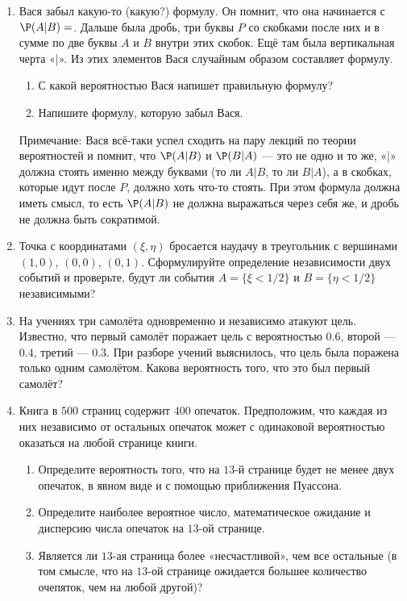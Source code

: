 \begin{enumerate}
\item Вася забыл какую-то (какую?) формулу. Он помнит, что она начинается
с $\P(A|B) = $. Дальше была дробь, три буквы $P$ со скобками после них и
в сумме по две буквы $A$ и $B$ внутри этих скобок. Ещё там была вертикальная черта «|».
Из этих элементов Вася случайным образом составляет формулу.
\begin{enumerate}
\item С какой вероятностью Вася напишет правильную формулу?
\item Напишите формулу, которую забыл Вася.
\end{enumerate}

Примечание: Вася всё-таки успел сходить на пару лекций по теории вероятностей и помнит,
что $\P(A|B)$ и $\P(B|A)$ — это не одно и то же, «|» должна стоять именно между буквами
(то ли $A|B$, то ли $B|A$), а в скобках, которые идут после $P$, должно хоть что-то стоять.
При этом формула должна иметь смысл, то есть  $\P(A|B)$   не должна выражаться через себя же,
и дробь не должна быть сократимой.

\item Точка с координатами $(\xi, \eta)$ бросается наудачу в треугольник с вершинами
$(1,0)$, $(0,0)$, $(0,1)$. Сформулируйте определение независимости двух событий и
проверьте, будут ли события $A=\{ \xi < 1/2 \}$  и $B=\{ \eta < 1/2 \}$  независимыми?

\item На учениях три самолёта одновременно и независимо атакуют цель.
Известно, что первый самолёт поражает цель с вероятностью $0.6$, второй — $0.4$,
третий — $0.3$. При разборе учений выяснилось, что цель была поражена только
одним самолётом. Какова вероятность того, что это был первый самолёт?

\item Книга в $500$ страниц содержит $400$ опечаток. Предположим, что каждая
из них независимо от остальных опечаток может с одинаковой вероятностью оказаться
на любой странице книги.
\begin{enumerate}
\item Определите вероятность того, что на $13$-й странице будет не менее двух опечаток,
в явном виде и с помощью приближения Пуассона.
\item Определите наиболее вероятное число, математическое ожидание и дисперсию числа
опечаток на $13$-ой странице.
\item Является ли $13$-ая страница более «несчастливой», чем все остальные
(в том смысле, что на $13$-ой странице ожидается большее количество очепяток,
чем на любой другой)?
\end{enumerate}


\end{enumerate}
